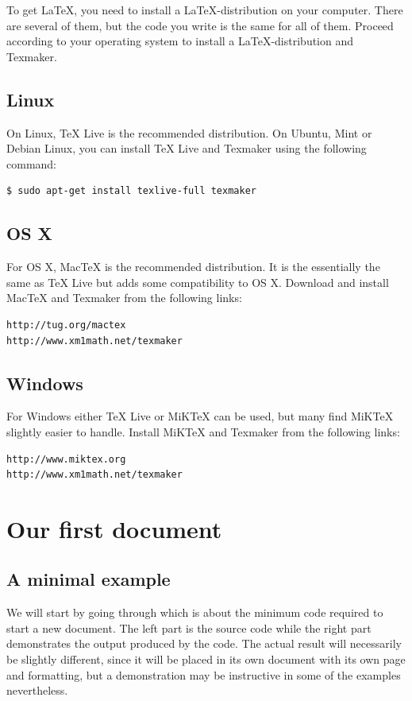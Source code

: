 To get \LaTeX{}, you need to install a \LaTeX{}-distribution on your computer. There are several of them, but the code you write is the same for all of them. Proceed according to your operating system to install a \LaTeX-distribution and Texmaker.

\subsection{Linux}
On Linux, TeX Live is the recommended distribution. On Ubuntu, Mint or Debian Linux, you can install TeX Live and Texmaker using the following command:
\begin{verbatim}
$ sudo apt-get install texlive-full texmaker
\end{verbatim}

\subsection{OS X}
For OS X, MacTeX is the recommended distribution. It is the essentially the same as TeX Live but adds some compatibility to OS X. Download and install MacTeX and Texmaker from the following links:

\begin{verbatim}
http://tug.org/mactex
http://www.xm1math.net/texmaker
\end{verbatim}

\subsection{Windows}
For Windows either TeX Live or MiKTeX can be used, but many find MiKTeX slightly easier to handle. Install MiKTeX and Texmaker from the following links:

\begin{verbatim}
http://www.miktex.org
http://www.xm1math.net/texmaker
\end{verbatim}

\section{Our first document}

\subsection{A minimal example}
We will start by going through  which is about the minimum code required to start a new document. The left part is the source code while the right part demonstrates the output produced by the code. The actual result will necessarily be slightly different, since it will be placed in its own document with its own page and formatting, but a demonstration may be instructive in some of the examples nevertheless.

